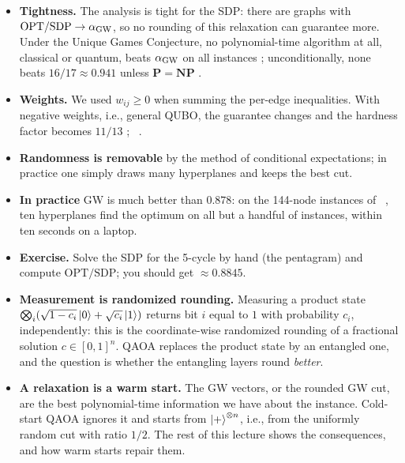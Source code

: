 \documentclass[overheadsbeamer.tex]{subfiles}
\begin{document}
\begin{frame}
\begin{itemize}\setlength\itemsep{0.3em}
    \item \textbf{Tightness.} The analysis is tight for the SDP: there are graphs with $\mathrm{OPT}/\mathrm{SDP} \to \alpha_{\rm GW}$, so no rounding of this relaxation can guarantee more. Under the Unique Games Conjecture, no polynomial-time algorithm at all, classical or quantum, beats $\alpha_{\rm GW}$ on all instances \cite{khot2010unique}; unconditionally, none beats $16/17 \approx 0.941$ unless $\mathbf P = \mathbf{NP}$ \cite{Hstad2001}.
    \item \textbf{Weights.} We used $w_{ij}\ge 0$ when summing the per-edge inequalities. With negative weights, i.e., general QUBO, the guarantee changes and the hardness factor becomes $11/13$ \cite{charikar2004maximizing}; \Chap~.
    \item \textbf{Randomness is removable} by the method of conditional expectations; in practice one simply draws many hyperplanes and keeps the best cut.
    \item \textbf{In practice} GW is much better than $0.878$: on the 144-node instances of \Chap~, ten hyperplanes find the optimum on all but a handful of instances, within ten seconds on a laptop.
    \item \textbf{Exercise.} Solve the SDP for the 5-cycle by hand (the pentagram) and compute $\mathrm{OPT}/\mathrm{SDP}$; you should get $\approx 0.8845$.
\end{itemize}
\end{frame}

\begin{frame}
\begin{itemize}\setlength\itemsep{0.4em}
    \item \textbf{Measurement is randomized rounding.} Measuring a product state $\bigotimes_i(\sqrt{1-c_i}\ket0 + \sqrt{c_i}\ket1)$ returns bit $i$ equal to $1$ with probability $c_i$, independently: this is the coordinate-wise randomized rounding of a fractional solution $c \in [0,1]^n$. QAOA replaces the product state by an entangled one, and the question is whether the entangling layers round \emph{better}.
    \item \textbf{A relaxation is a warm start.} The GW vectors, or the rounded GW cut, are the best polynomial-time information we have about the instance. Cold-start QAOA ignores it and starts from $\ket{+}^{\otimes n}$, i.e., from the uniformly random cut with ratio $1/2$. The rest of this lecture shows the consequences, and how warm starts repair them.
\end{itemize}
\end{frame}
\end{document}

